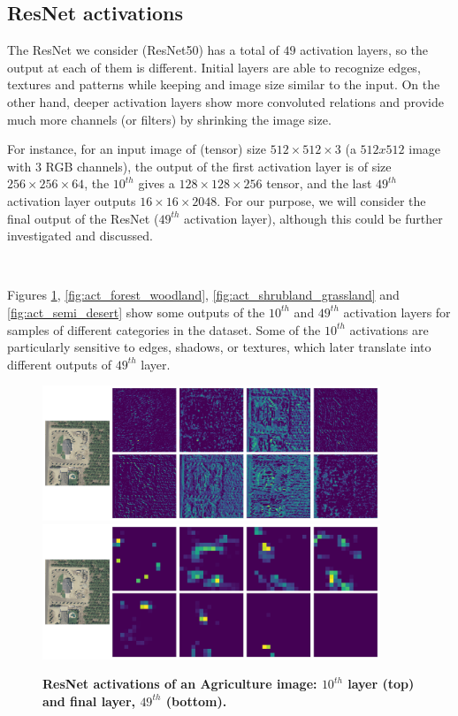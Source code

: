\subsection{ResNet activations}

The ResNet we consider (ResNet50) has a total of $49$ activation layers, so the output at each of them is different. Initial layers are able to recognize edges, textures and patterns while keeping and image size similar to the input. On the other hand, deeper activation layers show more convoluted relations and provide much more channels (or filters) by shrinking the image size.

For instance, for an input image of (tensor) size $512 \times 512 \times 3$ (a $512x512$ image with $3$ RGB channels), the output of the first activation layer is of size $256 \times 256 \times 64$, the $10^{th}$ gives a $128 \times 128 \times 256$ tensor, and the last $49^{th}$ activation layer outputs $16 \times 16 \times 2048$. For our purpose, we will consider the final output of the ResNet ($49^{th}$ activation layer), although this could be further investigated and discussed.

\

Figures \ref{fig:act_agriculture}, \ref{fig:act_forest_woodland}, \ref{fig:act_shrubland_grassland} and \ref{fig:act_semi_desert} show some outputs of the $10^{th}$ and $49^{th}$ activation layers for samples of different categories in the dataset. Some of the $10^{th}$ activations are particularly sensitive to edges, shadows, or textures, which later translate into different outputs of $49^{th}$ layer.

\begin{figure}[h!]
	\centering
	\includegraphics[width=0.9\textwidth]{Figures/activations/agriculture_l2_s1_activation_10.png}
	\includegraphics[width=0.9\textwidth]{Figures/activations/agriculture_l2_s1_activation_49.png}
	\captionsetup{width=1\linewidth}
	\caption{\textbf{ResNet activations of an Agriculture image: $10^{th}$ layer (top) and final layer, $49^{th}$ (bottom).}}
	\label{fig:act_agriculture}
\end{figure}

